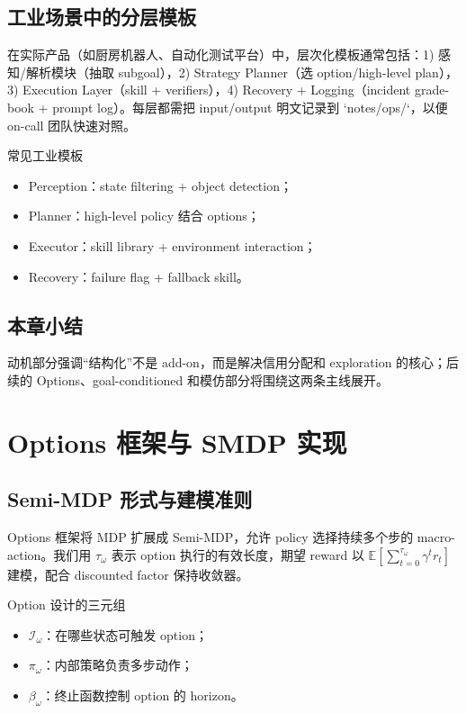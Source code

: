 \documentclass[a4paper]{article}
\begin{document}
\subsection{工业场景中的分层模板}

在实际产品（如厨房机器人、自动化测试平台）中，层次化模板通常包括：1) 感知/解析模块（抽取 subgoal），2) Strategy Planner（选 option/high-level plan），3) Execution Layer（skill + verifiers），4) Recovery + Logging（incident grade-book + prompt log）。每层都需把 input/output 明文记录到 `notes/ops/`，以便 on-call 团队快速对照。

\begin{knowledgebox}{常见工业模板}
\begin{itemize}
    \item Perception：state filtering + object detection；
    \item Planner：high-level policy 结合 options；
    \item Executor：skill library + environment interaction；
    \item Recovery：failure flag + fallback skill。
\end{itemize}
\end{knowledgebox}

\subsection{本章小结}

动机部分强调“结构化”不是 add-on，而是解决信用分配和 exploration 的核心；后续的 Options、goal-conditioned 和模仿部分将围绕这两条主线展开。

\section{Options 框架与 SMDP 实现}

\subsection{Semi-MDP 形式与建模准则}

Options 框架将 MDP 扩展成 Semi-MDP，允许 policy 选择持续多个步的 macro-action。我们用 $\tau_\omega$ 表示 option 执行的有效长度，期望 reward 以 $\mathbb{E}\left[\sum_{t=0}^{\tau_\omega} \gamma^t r_t\right]$ 建模，配合 discounted factor 保持收敛器。

\begin{importantbox}{Option 设计的三元组}
\begin{itemize}
    \item $\mathcal{I}_\omega$：在哪些状态可触发 option；
    \item $\pi_\omega$：内部策略负责多步动作；
    \item $\beta_\omega$：终止函数控制 option 的 horizon。
\end{itemize}
\end{importantbox}
\end{document}
